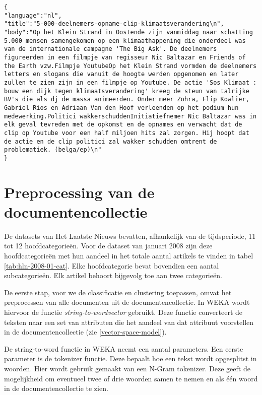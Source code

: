 \begin{lstlisting}
{
"language":"nl",
"title":"5-000-deelnemers-opname-clip-klimaatsverandering\n",
"body":"Op het Klein Strand in Oostende zijn vanmiddag naar schatting 5.000 mensen samengekomen op een klimaathappening die onderdeel was van de internationale campagne 'The Big Ask'. De deelnemers figureerden in een filmpje van regisseur Nic Baltazar en Friends of the Earth vzw.Filmpje YoutubeOp het Klein Strand vormden de deelnemers letters en slogans die vanuit de hoogte werden opgenomen en later zullen te zien zijn in een filmpje op Youtube. De actie 'Sos Klimaat : bouw een dijk tegen klimaatsverandering' kreeg de steun van talrijke BV's die als dj de massa animeerden. Onder meer Zohra, Flip Kowlier, Gabriel Rios en Adriaan Van den Hoof verleenden op het podium hun medewerking.Politici wakkerschuddenInitiatiefnemer Nic Baltazar was in elk geval tevreden met de opkomst en de opnames en verwacht dat de clip op Youtube voor een half miljoen hits zal zorgen. Hij hoopt dat de actie en de clip politici zal wakker schudden omtrent de problematiek. (belga/ep)\n"
}
\end{lstlisting} 

\section{Preprocessing van de documentencollectie}\label{preprocessing}
De datasets van Het Laatste Nieuws bevatten, afhankelijk van de tijdsperiode, 11 tot 12 hoofdcategorie\"en. Voor de dataset van januari 2008 zijn deze hoofdcategorie\"en met hun aandeel in het totale aantal artikels te vinden in tabel \ref{tab:hln-2008-01-cat}. Elke hoofdcategorie bevat bovendien een aantal subcategorie\"en. Elk artikel behoort bijgevolg toe aan twee categorie\"en. 

De eerste stap, voor we de classificatie en clustering toepassen, omvat het preprocessen van alle documenten uit de documentencollectie. In WEKA wordt hiervoor de functie \textit{string-to-wordvector} gebruikt. Deze functie converteert de teksten naar een set van attributen die het aandeel van dat attribuut voorstellen in de documentencollectie (zie \ref{vector-space-model}). 

De string-to-word functie in WEKA neemt een aantal parameters. Een eerste parameter is de tokenizer functie. Deze bepaalt hoe een tekst wordt opgesplitst in woorden. Hier wordt gebruik gemaakt van een N-Gram tokenizer. Deze geeft de mogelijkheid om eventueel twee of drie woorden samen te nemen en als \'e\'en woord in de documentencollectie te zien.

